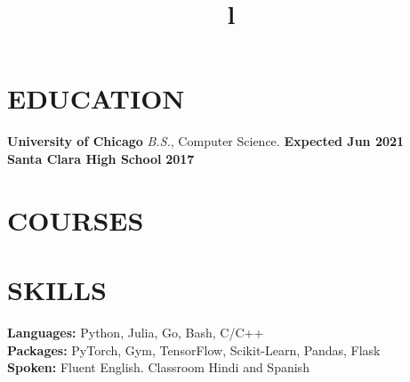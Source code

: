 \documentclass[margin]{res}
\begin{document}
\begin{resume}

\section{EDUCATION}
\textbf{University of Chicago}
{\sl B.S.}, Computer Science. \hfill \textbf{Expected Jun 2021}\\
\textbf{Santa Clara High School} \hfill \textbf{2017}

\section{COURSES}
\par
{}

\section{SKILLS}
\textbf{Languages:} Python, Julia, Go, Bash, C/C++\\
\textbf{Packages:} PyTorch, Gym, TensorFlow, Scikit-Learn, Pandas, Flask \\
\textbf{Spoken:} Fluent English. Classroom Hindi and Spanish

\begin{format}
\title{l}\\
\\
\body\\
\end{format}

\end{resume}
\end{document}
